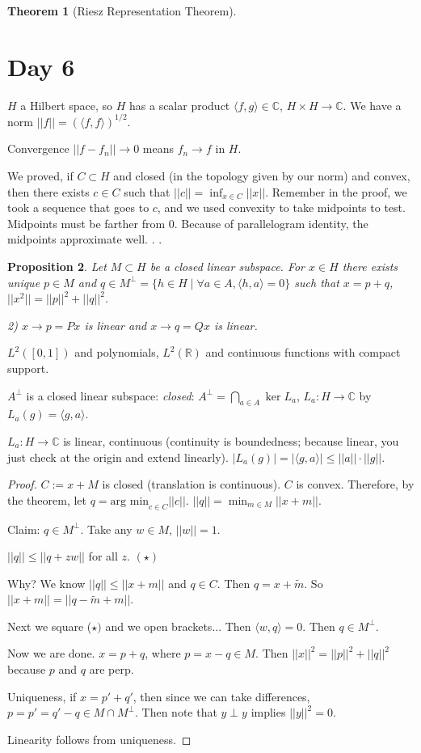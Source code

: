 \documentclass[11pt]{article}
\newtheorem{thm}{Theorem}[section]
\newtheorem{prop}[thm]{Proposition}
\newcommand{\mb}[1]{\mbox{#1}}
\newcommand{\ti}{\times}
\newcommand{\ra}{\rightarrow}
\newcommand{\sbs}{\subset}
\newcommand{\lan}{\langle}
\newcommand{\ran}{\rangle}
\newcommand{\bca}[2]{\bigcap_{#1}^{#2}}
\newcommand{\re}{\mathbb{R}}
\newcommand{\co}{\mathbb{C}}
\begin{document}
\begin{thm}[Riesz Representation Theorem]
\end{thm}

\section{Day 6}

$H$ a Hilbert space, so $H$ has a scalar product $\langle f,g\rangle\in\co$, $H\ti H\ra\co$. We have a norm $||f||=(\lan f,f\ran)^{1/2}$. 

Convergence $||f-f_n||\ra 0$ means $f_n\ra f$ in $H$. 

We proved, if $C\sbs H$ and closed (in the topology given by our norm) and convex, then there exists $c\in C$ such that $||c||=\inf_{x\in C}||x||$. Remember in the proof, we took a sequence that goes to $c$, and we used convexity to take midpoints to test. Midpoints must be farther from 0. Because of parallelogram identity, the midpoints approximate well. . .

\begin{prop}
Let $M\sbs H$ be a closed linear subspace. For $x\in H$ there exists unique $p\in M$ and $q\in M^{\perp}=\{h\in H\mid \forall a\in A, \lan h,a\ran=0\}$ such that $x=p+q$, $||x^2||=||p||^2+||q||^2$. 

2) $x\ra p=Px$ is linear and $x\ra q=Qx$ is linear. 
\end{prop}

$L^2([0,1])$ and polynomials, $L^2(\re)$ and continuous functions with compact support. 

$A^{\perp}$ is a closed linear subspace: {\it closed}: $A^{\perp}=\bca{a\in A}{}\ker L_a$, $L_a:H\ra\co$ by $L_a(g)=\lan g,a\ran$. 

$L_a:H\ra\co$ is linear, continuous (continuity is boundedness; because linear, you just check at the origin and extend linearly). $|L_a(g)|=|\lan g,a\ran|\le ||a||\cdot||g||$. 

\begin{proof}
$C:=x+M$ is closed (translation is continuous). $C$ is convex. Therefore, by the theorem, let $q=\mb{arg min}_{c\in C}||c||$. $||q||=\min_{m\in M}||x+m||$. 

Claim: $q\in M^{\perp}$. Take any $w\in M$, $||w||=1$. 

$||q||\le ||q+zw||$ for all $z$. $(\star)$

Why? We know $||q||\le||x+m||$ and $q\in C$. Then $q=x+\tilde m$. So $||x+m||=||q-\tilde m+m||$. 

Next we square ($\star)$ and we open brackets... Then $\lan w,q\ran=0$. Then $q\in M^{\perp}$. 

Now we are done. $x=p+q$, where $p=x-q\in M$. Then $||x||^2=||p||^2+||q||^2$ because $p$ and $q$ are perp. 

Uniqueness, if $x=p'+q'$, then since we can take differences, $p=p'=q'-q\in M\cap M^{\perp}$. Then note that $y\perp y$ implies $||y||^2=0$. 

Linearity follows from uniqueness. 
\end{proof}
\end{document}
